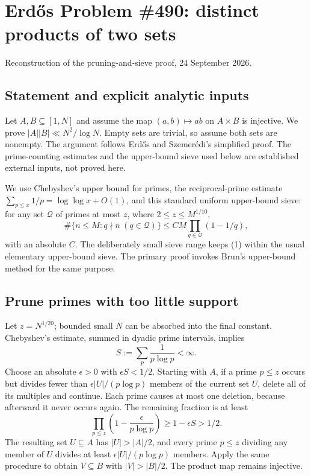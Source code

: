 \section{Erd\H{o}s Problem \#490: distinct products of two sets}
\noindent Reconstruction of the pruning-and-sieve proof, 24 September 2026.

\subsection*{Statement and explicit analytic inputs}
Let $A,B\subseteq[1,N]$ and assume the map $(a,b)\mapsto ab$ on $A\times B$ is injective. We prove $|A||B|\ll N^2/\log N$. Empty sets are trivial, so assume both sets are nonempty. The argument follows Erd\H{o}s and Szemer\'edi's simplified proof. The prime-counting estimates and the upper-bound sieve used below are established external inputs, not proved here.

We use Chebyshev's upper bound for primes, the reciprocal-prime estimate $\sum_{p\le x}1/p=\log\log x+O(1)$, and this standard uniform upper-bound sieve: for any set $\mathcal Q$ of primes at most $z$, where $2\le z\le M^{1/10}$,
\[\#\{n\le M:q\nmid n\ (q\in\mathcal Q)\}
\le C M\prod_{q\in\mathcal Q}(1-1/q),\tag{1}\]
with an absolute $C$. The deliberately small sieve range keeps (1) within the usual elementary upper-bound sieve. The primary proof invokes Brun's upper-bound method for the same purpose.

\subsection*{Prune primes with too little support}
Let $z=N^{1/20}$; bounded small $N$ can be absorbed into the final constant. Chebyshev's estimate, summed in dyadic prime intervals, implies
\[S:=\sum_p\frac1{p\log p}<\infty.
\]
Choose an absolute $\epsilon>0$ with $\epsilon S<1/2$. Starting with $A$, if a prime $p\le z$ occurs but divides fewer than $\epsilon|U|/(p\log p)$ members of the current set $U$, delete all of its multiples and continue. Each prime causes at most one deletion, because afterward it never occurs again. The remaining fraction is at least
\[\prod_{p\le z}\left(1-\frac\epsilon{p\log p}\right)
\ge1-\epsilon S>1/2.
\]
The resulting set $U\subseteq A$ has $|U|>|A|/2$, and every prime $p\le z$ dividing any member of $U$ divides at least $\epsilon|U|/(p\log p)$ members. Apply the same procedure to obtain $V\subseteq B$ with $|V|>|B|/2$. The product map remains injective.

